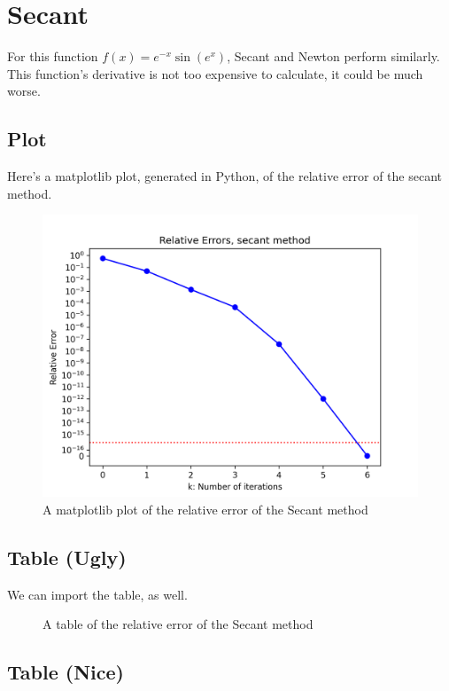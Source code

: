 \documentclass{article}
\begin{document}
\newpage
\section{Secant}
For this function $f(x) = e^{-x} \sin(e^x)$, Secant and Newton perform similarly.
This function's derivative is not too expensive to calculate, it could be much worse.

\subsection{Plot}

Here's a matplotlib plot, generated in Python, of the relative error of the
secant method.

\begin{figure}[h]
    \centering
    \includegraphics[scale=0.8]{./plots/secantrel.png}
    \caption{A matplotlib plot of the relative error of the Secant method}
\end{figure}


\subsection{Table (Ugly)}

We can import the table, as well.

\begin{figure}
    \centering
    \caption{A table of the relative error of the Secant method}
\end{figure}

\subsection{Table (Nice)}
\end{document}
